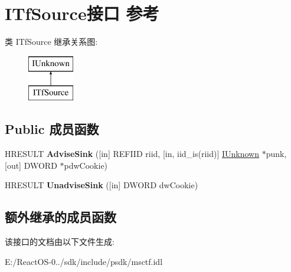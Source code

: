 \hypertarget{interface_i_tf_source}{}\section{I\+Tf\+Source接口 参考}
\label{interface_i_tf_source}
类 I\+Tf\+Source 继承关系图\+:\begin{figure}[H]
\begin{center}
\leavevmode
\includegraphics[height=2.000000cm]{interface_i_tf_source}
\end{center}
\end{figure}
\subsection*{Public 成员函数}
\begin{DoxyCompactItemize}
\item 
\mbox{\label{interface_i_tf_source_a571f7f5331eed342abf142db38501065}} 
H\+R\+E\+S\+U\+LT {\bfseries Advise\+Sink} (\mbox{[}in\mbox{]} R\+E\+F\+I\+ID riid, \mbox{[}in, iid\+\_\+is(riid)\mbox{]} \hyperlink{interface_i_unknown}{I\+Unknown} $\ast$punk, \mbox{[}out\mbox{]} D\+W\+O\+RD $\ast$pdw\+Cookie)
\item 
\mbox{\label{interface_i_tf_source_abdea6f16ddab179c2bfd01acdbabe3d6}} 
H\+R\+E\+S\+U\+LT {\bfseries Unadvise\+Sink} (\mbox{[}in\mbox{]} D\+W\+O\+RD dw\+Cookie)
\end{DoxyCompactItemize}
\subsection*{额外继承的成员函数}


该接口的文档由以下文件生成\+:\begin{DoxyCompactItemize}
\item 
E\+:/\+React\+O\+S-\/0../sdk/include/psdk/msctf.\+idl\end{DoxyCompactItemize}

